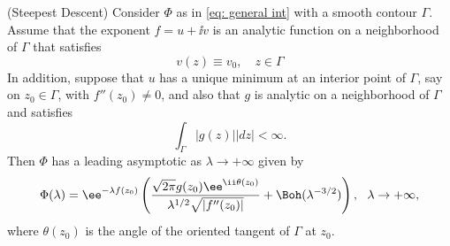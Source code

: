 \begin{teorema} (Steepest Descent)
	Consider $\Phi$ as in \ref{eq: general int} with a smooth contour $\Gamma$. Assume that the exponent $f = u + \ii v$ is an analytic function on a neighborhood of $\Gamma$ that satisfies
	\begin{equation}
		v(z) \equiv v_0, \quad z \in \Gamma
	\end{equation}
	In addition, suppose that $u$ has a unique minimum at an interior point of $\Gamma$, say on $z_0 \in \Gamma$, with $f''(z_0) \neq 0$, and also that $g$ is analytic on a neighborhood of $\Gamma$  and satisfies
	\begin{equation}
		\int_{\Gamma} |g(z)| |dz| < \infty.
	\end{equation}
	Then $\Phi$ has a leading asymptotic as $\lambda \rightarrow +\infty$ given by
	\begin{equation}
		\Phi(\lambda) = \ee^{-\lambda f(z_0)} \left(\frac{\sqrt{2\pi}g(z_0)\ee^{\ii \theta(z_0)}}{\lambda^{1/2}\sqrt{|f''(z_0)|}} + \Boh(\lambda^{-3/2}) \right), \ \ \lambda \rightarrow + \infty,
	\end{equation}
	where $\theta(z_0)$ is the angle of the oriented tangent of $\Gamma$ at $z_0$.
\end{teorema}

